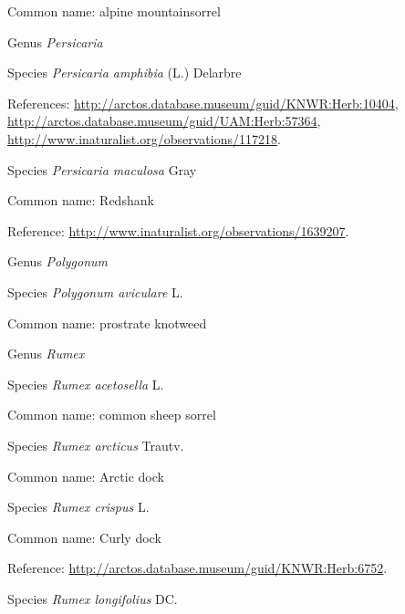 \documentclass[9pt, article]{memoir}
\begin{document}
\begin{multicols}{2}
Common name: alpine mountainsorrel

\vspace{6pt}\noindent\hspace{30pt}Genus \textit{Persicaria}


\vspace{6pt}\noindent\hspace{36pt}Species \textit{Persicaria amphibia} (L.) Delarbre


References: 
\url{http://arctos.database.museum/guid/KNWR:Herb:10404}, 
\url{http://arctos.database.museum/guid/UAM:Herb:57364}, 
\url{http://www.inaturalist.org/observations/117218}.

\vspace{6pt}\noindent\hspace{36pt}Species \textit{Persicaria maculosa} Gray


Common name: Redshank

Reference: 
\url{http://www.inaturalist.org/observations/1639207}.

\vspace{6pt}\noindent\hspace{30pt}Genus \textit{Polygonum}


\vspace{6pt}\noindent\hspace{36pt}Species \textit{Polygonum aviculare} L.


Common name: prostrate knotweed

\vspace{6pt}\noindent\hspace{30pt}Genus \textit{Rumex}


\vspace{6pt}\noindent\hspace{36pt}Species \textit{Rumex acetosella} L.


Common name: common sheep sorrel

\vspace{6pt}\noindent\hspace{36pt}Species \textit{Rumex arcticus} Trautv.


Common name: Arctic dock

\vspace{6pt}\noindent\hspace{36pt}Species \textit{Rumex crispus} L.


Common name: Curly dock

Reference: 
\url{http://arctos.database.museum/guid/KNWR:Herb:6752}.

\vspace{6pt}\noindent\hspace{36pt}Species \textit{Rumex longifolius} DC.



\end{multicols}
\end{document}
